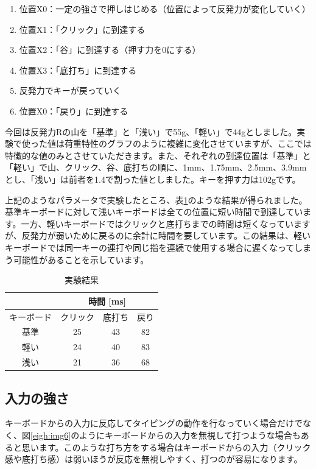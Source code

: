 \begin{enumerate}
 \item 位置X0：一定の強さで押しはじめる（位置によって反発力が変化していく）
 \item 位置X1：「クリック」に到達する
 \item 位置X2：「谷」に到達する（押す力を0にする）
 \item 位置X3：「底打ち」に到達する
 \item 反発力でキーが戻っていく
 \item 位置X0：「戻り」に到達する
\end{enumerate}

今回は反発力Rの山を「基準」と「浅い」で55g、「軽い」で44gとしました。実験で使った値は荷重特性のグラフのように複雑に変化させていますが、ここでは特徴的な値のみとさせていただきます。また、それぞれの到達位置は「基準」と「軽い」で山、クリック、谷、底打ちの順に、1mm、1.75mm、2.5mm、3.9mmとし、「浅い」は前者を1.4で割った値としました。キーを押す力は102gです。

上記のようなパラメータで実験したところ、表\ref{eigh:result}のような結果が得られました。基準キーボードに対して浅いキーボードは全ての位置に短い時間で到達しています。一方、軽いキーボードではクリックと底打ちまでの時間は短くなっていますが、反発力が弱いために戻るのに余計に時間を要しています。この結果は、軽いキーボードでは同一キーの連打や同じ指を連続で使用する場合に遅くなってしまう可能性があることを示しています。

\begin{table}
\begin{center}
\caption{実験結果}
\label{eigh:result}
\begin{tabular}{|c|c|c|c|}
\hline
 & \multicolumn{3}{|c|}{時間 [ms]} \\
\hline
キーボード & クリック & 底打ち & 戻り \\
\hline
基準 & 25 & 43 & 82 \\
\hline
軽い & 24 & 40 & 83 \\
\hline
浅い & 21 & 36 & 68 \\
\hline
\end{tabular}
\end{center}
\end{table}

\subsection{入力の強さ}
キーボードからの入力に反応してタイピングの動作を行なっていく場合だけでなく、図\ref{eigh:img6}のようにキーボードからの入力を無視して打つような場合もあると思います。このような打ち方をする場合はキーボードからの入力（クリック感や底打ち感）は弱いほうが反応を無視しやすく、打つのが容易になります。


